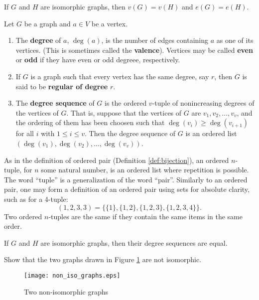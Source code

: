 \begin{corollary} If $G$ and $H$ are isomorphic graphs, then $v(G)=v(H)$ and $e(G)=e(H)$.
\end{corollary}

\begin{definition} Let $G$ be a graph and $a\in V$ be a vertex.
\begin{enumerate}
    \item The \textbf{degree} of $a$, $\deg(a)$, is the number of edges containing $a$ as one of its vertices.  (This is sometimes called the \textbf{valence}).  Vertices may be called \textbf{even} or \textbf{odd} if they have even or odd degreee, respectively.
    \item If $G$ is a graph such that every vertex has the same degree, say $r$, then $G$ is said to be \textbf{regular of degree} $r$.
    \item The \textbf{degree sequence} of $G$ is the ordered $v$-tuple of nonincreasing degrees of the vertices of $G$.  That is, suppose that the vertices of $G$ are $v_1, v_2, \ldots, v_v$, and the ordering of them has been choosen such that $\deg(v_i)\geq \deg(v_{i+1})$ for all $i$ with $1 \leq i \leq v$.  Then the degree sequence of $G$ is an ordered list $(\deg(v_1), \deg(v_2), \ldots, \deg(v_v))$.
\end{enumerate}
\end{definition}

\begin{remark} As in the definition of ordered pair (Definition \ref{def:bijection}), an ordered $n$-tuple, for $n$ some natural number, is an ordered list where repetition is possible.  The word ``tuple'' is a generalization of the word ``pair''. Similarly to an ordered pair, one may form a definition of an ordered pair using sets for absolute clarity, such as for a 4-tuple: $$(1,2,3,3) = \{\{1\}, \{1,2\}, \{1,2,3\}, \{1,2,3,4\}\}.$$
Two ordered $n$-tuples are the same if they contain the same items in the same order.
\end{remark}

\begin{theorem}\label{thm:degree_seq_invt} If $G$ and $H$ are isomorphic graphs, then their degree sequences are equal.
\end{theorem}

\begin{example} \label{ex:non-iso_graphs} Show that the two graphs drawn in Figure \ref{fig:non-iso_graphs} are not isomorphic.
\end{example}
\begin{figure}[hb]
\begin{center}
    \texttt{[image: non\_iso\_graphs.eps]}
    \label{fig:non-iso_graphs}
    \caption{Two non-isomorphic graphs}
\end{center}
\end{figure}

